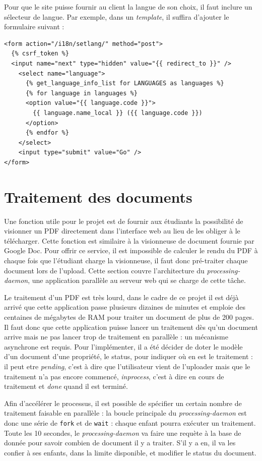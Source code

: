 \documentclass[a4paper,12pt]{article}
\begin{document}
Pour que le site puisse fournir au client la langue de son choix, il faut inclure
un sélecteur de langue. Par exemple, dans un \textit{template}, il suffira d'ajouter
le formulaire suivant : 

\begin{verbatim}
<form action="/i18n/setlang/" method="post">
  {% csrf_token %}
  <input name="next" type="hidden" value="{{ redirect_to }}" />
    <select name="language">
      {% get_language_info_list for LANGUAGES as languages %}
      {% for language in languages %}
      <option value="{{ language.code }}">
        {{ language.name_local }} ({{ language.code }})
      </option>
      {% endfor %}
    </select>
    <input type="submit" value="Go" />
</form>
\end{verbatim}


\section{Traitement des documents}

Une fonction utile pour le projet est de fournir aux étudiants la possibilité
de visionner un PDF directement dans l'interface web au lieu de les obliger
à le télécharger. Cette fonction est similaire à la visionneuse de document fournie
par Google Doc. Pour offrir ce service, il est impossible de calculer le rendu du PDF
à chaque fois que l'étudiant charge la visionneuse, il faut donc pré-traiter chaque
document lors de l'upload. Cette section couvre l'architecture du \textit{processing-daemon},
une application parallèle au serveur web qui se charge de cette tâche.

Le traitement d'un PDF est très lourd, dans le cadre de ce projet il est déjà
arrivé que cette application passe plusieurs dizaines de minutes et emploie des centaines
de mégabytes de RAM pour traiter un document de plus de 200 pages. Il faut
donc que cette application puisse lancer un traitement dès qu'un document arrive
mais ne pas lancer trop de traitement en parallèle : un mécanisme asynchrone est requis.
Pour l'implémenter, il a été décider de doter le modèle d'un document d'une propriété,
le status, pour indiquer où en est le traitement : il peut etre \textit{pending}, c'est
à dire que l'utilisateur vient de l'uploader mais que le traitement n'a pas encore commencé,
\textit{inprocess}, c'est à dire en cours de traitement et \textit{done} quand il est terminé.

Afin d'accélérer le processus, il est possible de spécifier un certain
nombre de traitement faisable en parallèle : la boucle principale du \textit{processing-daemon}
est donc une série de \texttt{fork} et de \texttt{wait} : chaque enfant pourra exécuter un traitement.
Toute les 10 secondes, le \textit{processing-daemon} va faire une requète à la base
de donnée pour savoir combien de document il y a traiter. S'il y a en, il va les confier
à ses enfants, dans la limite disponible, et modifier le status du document.
\end{document}
